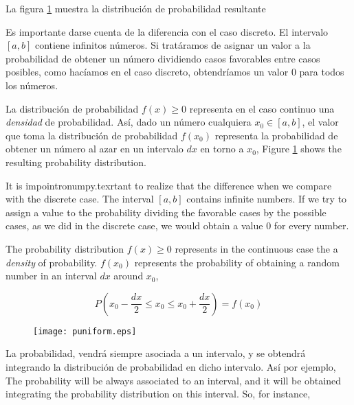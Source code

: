 \begin{paracol}{2}
La figura \ref{fig:puniform} muestra la distribución de probabilidad resultante

Es importante darse cuenta de la diferencia con el caso discreto. El intervalo $[a,b]$ contiene infinitos números. Si tratáramos de asignar un valor a la probabilidad de obtener un número dividiendo casos favorables entre casos posibles, como hacíamos en el caso discreto, obtendríamos un valor $0$ para todos los números. 

La distribución de probabilidad $f(x)\geqslant 0$ representa en el caso continuo una \emph{densidad} de probabilidad. Así, dado un número cualquiera $x_0 \in [a,b]$, el valor que toma la distribución de probabilidad $f(x_0)$ representa la probabilidad de obtener un número al azar en un intervalo $dx$ en torno a $x_0$,
\switchcolumn
Figure \ref{fig:puniform} shows the resulting probability distribution. 

It is impointronumpy.texrtant to realize that the difference when we compare with the discrete case. The interval $[a,b]$ contains infinite numbers. If we try to assign a value to the probability dividing the favorable cases by the possible cases, as we did in the discrete case,  we would obtain a value $0$ for every number.

The probability distribution  $f(x)\geqslant 0$ represents in the continuous case the a \emph{density} of probability. $f(x_0)$ represents the probability of obtaining a random number in an interval $dx$ around $x_0$,
\end{paracol}

\begin{equation*}
P\left(x_0-\frac{dx}{2}\leqslant x_0 \leqslant x_0+\frac{dx}{2}\right) = f(x_0)
\end{equation*} 
\begin{figure}
	\centering
	\texttt{[image: puniform.eps]}
	\label{fig:puniform}
\end{figure}
\begin{paracol}{2}
La probabilidad, vendrá siempre asociada a un intervalo, y se obtendrá integrando la distribución de probabilidad en dicho intervalo. Así por ejemplo,
\switchcolumn
The probability will be always associated to an interval, and it will be obtained integrating the probability distribution on this interval. So, for instance, 
\end{paracol}

